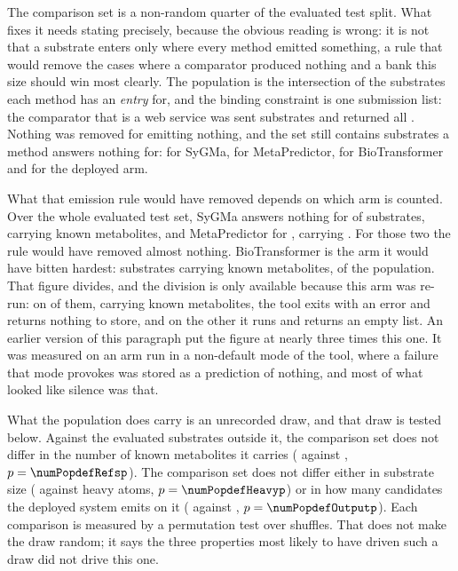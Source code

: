 \documentclass[journal=jcisd8,manuscript=suppinfo,layout=onecolumn]{achemso}
\begin{document}
The comparison set is a non-random quarter of the evaluated test split. What fixes
it needs stating precisely, because the obvious reading is wrong: it is not that a substrate
enters only where every method emitted something, a rule that would remove the cases where a
comparator produced nothing and a bank this size should win most clearly. The population is the
intersection of the substrates each method has an \emph{entry} for, and the binding constraint is
one submission list: the comparator that is a web service was sent
\numPopulationN{} substrates and returned all \numPopulationN{}.
 Nothing was removed for emitting
nothing, and the set still contains substrates a method answers nothing for:
\numPopdefSygmainsideWord{} for SyGMa, \numPopdefMetapredictorinsideWord{} for MetaPredictor,
\numPopdefBtinside{} for BioTransformer and \numPopdefGrailinsideWord{} for the deployed arm.

What that emission rule would have removed depends on which arm is counted. Over the whole
evaluated test set, SyGMa answers nothing for \numPopdefSygmasilent{} of
\numPopulationTestsubs{} substrates, carrying \numPopdefSygmasilentrefs{} known metabolites, and
MetaPredictor for \numPopdefMetapredictorsilent{}, carrying
\numPopdefMetapredictorsilentrefs{}. For those two the rule would have removed almost nothing.
BioTransformer is the arm it would have bitten hardest: \numPopdefBtsilent{} substrates carrying
\numPopdefBtsilentrefs{} known metabolites, \numPopdefBtsilentsharePct{} of the population. That figure
divides, and the division is only available because this arm was re-run: on
\numPopdefBtabsent{} of them, carrying \numPopdefBtabsentrefs{} known metabolites, the tool exits with
an error and returns nothing to store, and on the other \numPopdefBtblank{} it runs and returns
an empty list. An earlier version of this paragraph put the figure at nearly three times this
one. It was measured on an arm run in a non-default mode of the tool, where a failure that mode
provokes was stored as a prediction of nothing, and most of what looked like silence was that.

What the population does carry is an unrecorded draw, and that draw is tested below.
Against the \numPopdefOutside{} evaluated substrates outside it, the comparison set does not
differ in the number of known metabolites it carries
(\numPopdefRefsin{} against \numPopdefRefsout{}, $p=\numPopdefRefsp$). The comparison set does
not differ either in substrate size (\numPopdefHeavyin{} against \numPopdefHeavyout{} heavy
atoms, $p=\numPopdefHeavyp$) or in how many candidates the deployed system emits on it
(\numPopdefOutputin{} against \numPopdefOutputout{}, $p=\numPopdefOutputp$). Each comparison is
measured by a permutation test over \numPopdefPermutations{} shuffles. That does not make the draw random; it says the three
properties most likely to have driven such a draw did not drive this one.
\end{document}
